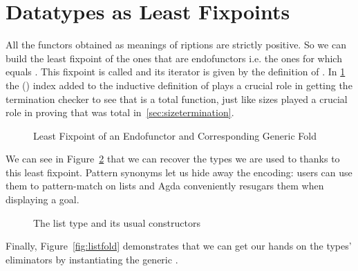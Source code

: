 \section{Datatypes as Least Fixpoints}

All the functors obtained as meanings of riptions are strictly positive.
So we can build the least fixpoint of the ones that are endofunctors i.e. the ones
for which  equals . This fixpoint is called  and its iterator is
given by the definition of  . In \cref{figure:datamu} the
 (\cite{DBLP:journals/corr/abs-1012-4896}) index added to the inductive
definition of  plays a crucial role in getting the termination checker to
see that  is a total function, just like sizes played a crucial role in
proving that  was total in~\cref{sec:sizetermination}.

\begin{figure}[h]
\caption{Least Fixpoint of an Endofunctor and Corresponding Generic Fold}\label{figure:datamu}
\end{figure}

We can see in Figure~\ref{fig:listpat} that we can recover the types we are
used to thanks to this least fixpoint. Pattern synonyms let us hide away
the encoding: users can use them to pattern-match on lists and Agda
conveniently resugars them when displaying a goal.

\begin{figure}[h]
\begin{center}
\end{center}

\begin{minipage}[t]{0.45\textwidth}
\end{minipage}
\begin{minipage}[t]{0.45\textwidth}
\end{minipage}
\caption{The list type and its usual constructors\label{fig:listpat}}
\end{figure}

Finally, Figure~\ref{fig:listfold} demonstrates that we can get our
hands on the types' eliminators by instantiating the generic .

